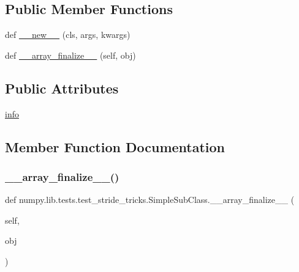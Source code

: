 \subsection*{Public Member Functions}
\begin{DoxyCompactItemize}
\item 
def \hyperlink{classnumpy_1_1lib_1_1tests_1_1test__stride__tricks_1_1SimpleSubClass_ae7060b605efaa15c102be1141df31a70}{\+\_\+\+\_\+new\+\_\+\+\_\+} (cls, args, kwargs)
\item 
def \hyperlink{classnumpy_1_1lib_1_1tests_1_1test__stride__tricks_1_1SimpleSubClass_a87dace45f5ad9cb3079a01c38f60e390}{\+\_\+\+\_\+array\+\_\+finalize\+\_\+\+\_\+} (self, obj)
\end{DoxyCompactItemize}
\subsection*{Public Attributes}
\begin{DoxyCompactItemize}
\item 
\hyperlink{classnumpy_1_1lib_1_1tests_1_1test__stride__tricks_1_1SimpleSubClass_a246b3fae75550a955fc394e5894785be}{info}
\end{DoxyCompactItemize}


\subsection{Member Function Documentation}
\mbox{\label{classnumpy_1_1lib_1_1tests_1_1test__stride__tricks_1_1SimpleSubClass_a87dace45f5ad9cb3079a01c38f60e390}} 
\subsubsection{\texorpdfstring{\+\_\+\+\_\+array\+\_\+finalize\+\_\+\+\_\+()}{\_\_array\_finalize\_\_()}}
{\footnotesize\ttfamily def numpy.\+lib.\+tests.\+test\+\_\+stride\+\_\+tricks.\+Simple\+Sub\+Class.\+\_\+\+\_\+array\+\_\+finalize\+\_\+\+\_\+ (\begin{DoxyParamCaption}\item[{}]{self,  }\item[{}]{obj }\end{DoxyParamCaption})}

